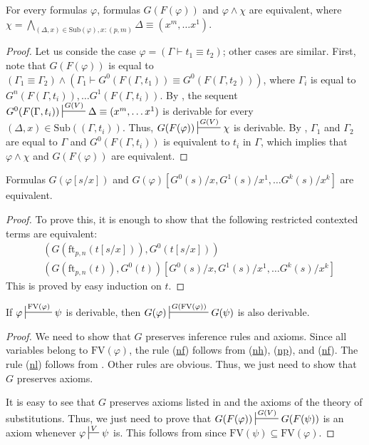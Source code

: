 \documentclass[reqno]{amsart}
\newcommand{\axref}[1]{(\hyperref[ax:#1]{#1})}
\theoremstyle{definition}
\theoremstyle{remark}
\newcommand{\fs}[1]{\mathrm{#1}}
\newcommand{\FV}{\fs{FV}}
\newcommand{\ft}{\fs{ft}}
\newcommand{\sub}{\fs{Sub}}
\numberwithin{figure}{section}
\begin{document}
\begin{lem}
For every formulas $\varphi$, formulas $G(F(\varphi))$ and $\varphi \land \chi$ are equivalent,
where $\chi = \bigwedge_{(\Delta,x) \in \sub(\varphi), x : (p,m)} \Delta \equiv (x^m, \ldots x^1)$.
\end{lem}
\begin{proof}
Let us conside the case $\varphi = (\Gamma \vdash t_1 \equiv t_2)$; other cases are similar.
First, note that $G(F(\varphi))$ is equal to $(\Gamma_1 \equiv \Gamma_2) \land (\Gamma_1 \vdash G^0(F(\Gamma,t_1)) \equiv G^0(F(\Gamma,t_2)))$,
where $\Gamma_i$ is equal to $G^n(F(\Gamma,t_i)), \ldots G^1(F(\Gamma,t_i))$.
By , the sequent $G^0(F(\Gamma,t_i)) \sststile{}{G(V)} \Delta \equiv (x^m, \ldots x^1)$ is derivable for every $(\Delta,x) \in \sub((\Gamma,t_i))$.
Thus, $G(F(\varphi)) \sststile{}{G(V)} \chi$ is derivable.
By , $\Gamma_1$ and $\Gamma_2$ are equal to $\Gamma$ and $G^0(F(\Gamma,t_i))$ is equivalent to $t_i$ in $\Gamma$, which implies that $\varphi \land \chi$ and $G(F(\varphi))$ are equivalent.
\end{proof}

\begin{lem}
Formulas $G(\varphi[s/x])$ and $G(\varphi)[G^0(s)/x, G^1(s)/x^1, \ldots G^k(s)/x^k]$ are equivalent.
\end{lem}
\begin{proof}
To prove this, it is enough to show that the following restricted contexted terms are equivalent:
\begin{align*}
& (G(\ft_{p,n}(t[s/x])), G^0(t[s/x])) \\
& (G(\ft_{p,n}(t)), G^0(t))[G^0(s)/x, G^1(s)/x^1, \ldots G^k(s)/x^k]
\end{align*}
This is proved by easy induction on $t$.
\end{proof}

\begin{lem}
If $\varphi \sststile{}{\FV(\varphi)} \psi$ is derivable, then $G(\varphi) \sststile{}{G(\FV(\varphi))} G(\psi)$ is also derivable.
\end{lem}
\begin{proof}
We need to show that $G$ preserves inference rules and axioms.
Since all variables belong to $\FV(\varphi)$, the rule \axref{nf} follows from \axref{nh}, \axref{np}, and \axref{nf}.
The rule \axref{nl} follows from .
Other rules are obvious.
Thus, we just need to show that $G$ preserves axioms.

It is easy to see that $G$ preserves axioms listed in  and the axioms of the theory of substitutions.
Thus, we just need to prove that $G(F(\varphi)) \sststile{}{G(V)} G(F(\psi))$ is an axiom whenever $\varphi \sststile{}{V} \psi$ is.
This follows from  since $\FV(\psi) \subseteq \FV(\varphi)$.
\end{proof}
\end{document}
